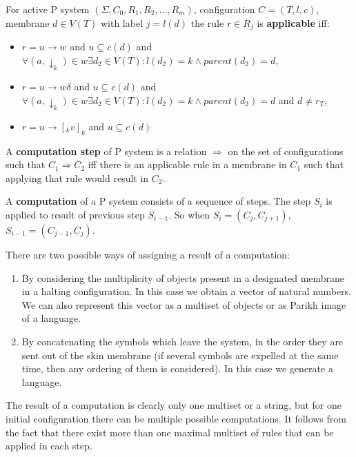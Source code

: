 
For active P system $(\Sigma, C_0, R_1, R_2, \dots , R_m)$, configuration $C = (T, l, c)$, membrane $d\in V(T)$ with label $j = l(d)$ the rule $r\in R_j$ is {\bf applicable} iff:
\begin{itemize}
  \item $r = u\rightarrow w$ and $u\subseteq c(d)$ and $\forall (a,\downarrow_k)\in w \exists d_2\in V(T): l(d_2)=k \wedge parent(d_2) = d$,
  \item $r = u\rightarrow w\delta$ and $u\subseteq c(d)$ and $\forall (a,\downarrow_k)\in w \exists d_2\in V(T): l(d_2)=k \wedge parent(d_2) = d$ and $d\neq r_T$,
  \item $r = u\rightarrow [_k v]_k$ and $u\subseteq c(d)$
\end{itemize}



A {\bf computation step} of P system is a relation $\Rightarrow$ on the set of configurations such that $C_1 \Rightarrow C_2$ iff there is an applicable rule in a membrane in $C_1$ such that applying that rule would result in $C_2$.

A {\bf computation} of a P system consists of a sequence of steps. The step $S_i$ is applied to result of previous step $S_{i-1}$. So when $S_i = (C_j,C_{j+1})$, $S_{i-1} = (C_{j-1},C_j)$.


There are two possible ways of assigning a result of a computation:

\begin{enumerate}
    \item By considering the multiplicity of objects present in a designated membrane in a halting configuration. In this case we obtain a vector of natural numbers. We can also represent this vector as a multiset of objects or as Parikh image of a language.
    \item By concatenating the symbols which leave the system, in the order they are sent out of the skin membrane (if several symbols are expelled at the same time, then any ordering of them is considered). In this case we generate a language.
\end{enumerate}

The result of a computation is clearly only one multiset or a string, but for one initial configuration there can be multiple possible computations. It follows from the fact that there exist more than one maximal multiset of rules that can be applied in each step.